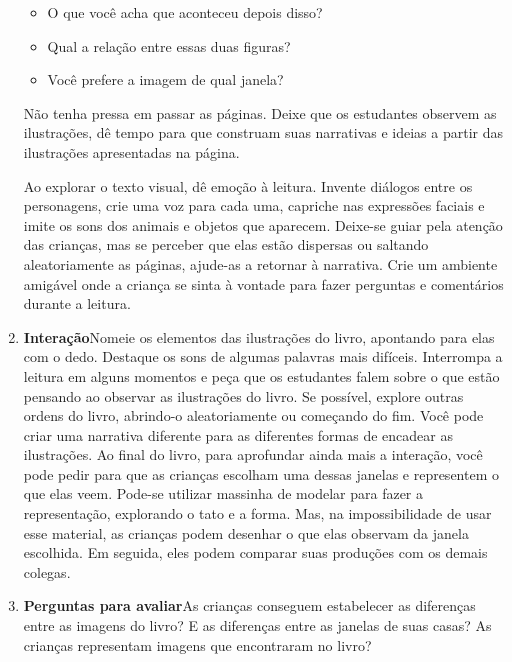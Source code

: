 \documentclass[11pt]{extarticle}
\begin{document}
\begin{enumerate}
\begin{itemize}
\item O que você acha que aconteceu depois disso?
\item Qual a relação entre essas duas figuras?
\item Você prefere a imagem de qual janela?
\end{itemize}

Não tenha pressa em passar as páginas. Deixe que os estudantes 
observem as ilustrações, dê tempo para que construam suas narrativas e ideias 
a partir das ilustrações apresentadas na página.



Ao explorar o texto visual, dê emoção 
à leitura. Invente diálogos entre os personagens, crie uma voz para 
cada uma, capriche nas expressões faciais e imite os sons dos animais e objetos que aparecem.
Deixe-se guiar pela atenção das crianças, mas se perceber que 
elas estão dispersas ou saltando aleatoriamente as páginas, ajude-as 
a retornar à narrativa. Crie um ambiente amigável onde a criança 
se sinta à vontade para fazer perguntas e comentários durante a leitura.


\item \textbf{Interação}\quad Nomeie os elementos das ilustrações 
do livro, apontando para elas com o dedo. Destaque os sons de algumas 
palavras mais difíceis. Interrompa a leitura em alguns momentos e peça que 
os estudantes falem sobre o que estão pensando ao observar as ilustrações do livro.
Se possível, explore outras ordens do livro, abrindo-o aleatoriamente ou começando do fim.
Você pode criar uma narrativa diferente para as diferentes formas de encadear as ilustrações.
Ao final do livro, para aprofundar ainda mais a interação, você pode pedir para que as crianças escolham uma dessas janelas e representem o que elas veem. Pode-se utilizar massinha de modelar para fazer a representação, explorando o tato e a forma. Mas, na impossibilidade de usar esse material, as crianças podem desenhar o que elas observam da janela escolhida. Em seguida, eles podem comparar suas produções com os demais colegas.  


\item \textbf{Perguntas para avaliar}\quad As crianças conseguem estabelecer as diferenças entre as imagens do livro? E as diferenças entre as janelas de suas casas? As crianças representam imagens que encontraram no livro?  

\end{enumerate}
\end{document}
